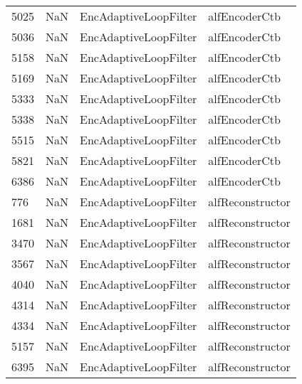 \begin{tabular}{llll}
5025 &                   NaN &      EncAdaptiveLoopFilter &                             alfEncoderCtb \\
5036 &                   NaN &      EncAdaptiveLoopFilter &                             alfEncoderCtb \\
5158 &                   NaN &      EncAdaptiveLoopFilter &                             alfEncoderCtb \\
5169 &                   NaN &      EncAdaptiveLoopFilter &                             alfEncoderCtb \\
5333 &                   NaN &      EncAdaptiveLoopFilter &                             alfEncoderCtb \\
5338 &                   NaN &      EncAdaptiveLoopFilter &                             alfEncoderCtb \\
5515 &                   NaN &      EncAdaptiveLoopFilter &                             alfEncoderCtb \\
5821 &                   NaN &      EncAdaptiveLoopFilter &                             alfEncoderCtb \\
6386 &                   NaN &      EncAdaptiveLoopFilter &                             alfEncoderCtb \\
776  &                   NaN &      EncAdaptiveLoopFilter &                          alfReconstructor \\
1681 &                   NaN &      EncAdaptiveLoopFilter &                          alfReconstructor \\
3470 &                   NaN &      EncAdaptiveLoopFilter &                          alfReconstructor \\
3567 &                   NaN &      EncAdaptiveLoopFilter &                          alfReconstructor \\
4040 &                   NaN &      EncAdaptiveLoopFilter &                          alfReconstructor \\
4314 &                   NaN &      EncAdaptiveLoopFilter &                          alfReconstructor \\
4334 &                   NaN &      EncAdaptiveLoopFilter &                          alfReconstructor \\
5157 &                   NaN &      EncAdaptiveLoopFilter &                          alfReconstructor \\
6395 &                   NaN &      EncAdaptiveLoopFilter &                          alfReconstructor \\

\end{tabular}
